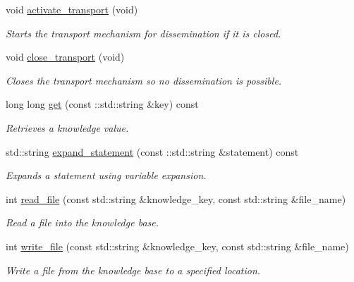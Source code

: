 \begin{DoxyCompactItemize}
void \hyperlink{classMadara_1_1Knowledge__Engine_1_1Knowledge__Base__Impl_af5126a6554f9239060fa4d2ace74731f}{activate\_\-transport} (void)
\begin{DoxyCompactList}\small\item\em Starts the transport mechanism for dissemination if it is closed. \item\end{DoxyCompactList}\item 
void \hyperlink{classMadara_1_1Knowledge__Engine_1_1Knowledge__Base__Impl_a1ff98293ff106e0083dfe0bb0f329bb8}{close\_\-transport} (void)
\begin{DoxyCompactList}\small\item\em Closes the transport mechanism so no dissemination is possible. \item\end{DoxyCompactList}\item 
long long \hyperlink{classMadara_1_1Knowledge__Engine_1_1Knowledge__Base__Impl_a7cfa45ebff186b873b723612266a30ba}{get} (const ::std::string \&key) const 
\begin{DoxyCompactList}\small\item\em Retrieves a knowledge value. \item\end{DoxyCompactList}\item 
std::string \hyperlink{classMadara_1_1Knowledge__Engine_1_1Knowledge__Base__Impl_a0d869097aafa7a7ae789d05db9eea6eb}{expand\_\-statement} (const ::std::string \&statement) const 
\begin{DoxyCompactList}\small\item\em Expands a statement using variable expansion. \item\end{DoxyCompactList}\item 
int \hyperlink{classMadara_1_1Knowledge__Engine_1_1Knowledge__Base__Impl_a978f6e581a0bc4f6cba1429c97f7a4e8}{read\_\-file} (const std::string \&knowledge\_\-key, const std::string \&file\_\-name)
\begin{DoxyCompactList}\small\item\em Read a file into the knowledge base. \item\end{DoxyCompactList}\item 
int \hyperlink{classMadara_1_1Knowledge__Engine_1_1Knowledge__Base__Impl_a145cbe315e384244cbe809aaf2f8dc30}{write\_\-file} (const std::string \&knowledge\_\-key, const std::string \&file\_\-name)
\begin{DoxyCompactList}\small\item\em Write a file from the knowledge base to a specified location. \item\end{DoxyCompactList}\item 

\end{DoxyCompactItemize}
